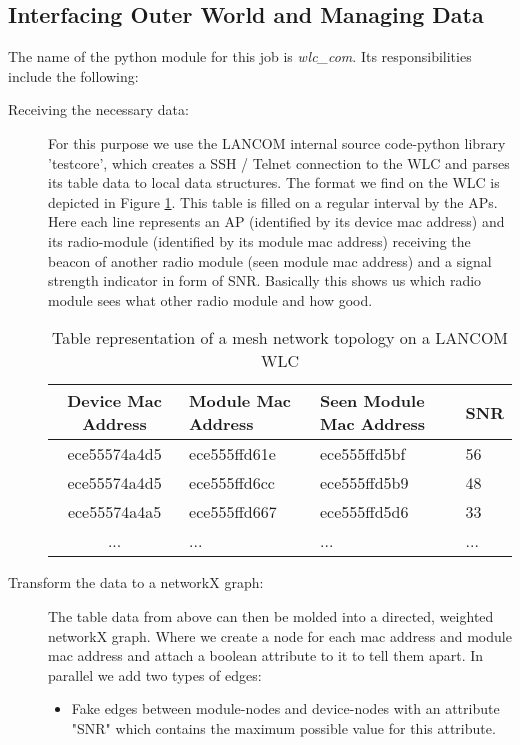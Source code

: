     \subsection{Interfacing Outer World and Managing Data}
      The name of the python module for this job is \textit{wlc\_com}. Its responsibilities include the following:
      \begin{description}
	\item[Receiving the necessary data:]
	  For this purpose we use the LANCOM internal source code-python library 'testcore', which creates a \ac{SSH} / Telnet connection to the 
	  \ac{WLC} and parses its table data to local data structures.
	  The format we find on the \ac{WLC} is depicted in Figure \ref{tab:wlc}. This table is filled on a regular interval by the APs.
	  Here each line represents an \ac{AP} (identified by its device mac address) and its radio-module (identified by its module mac address) receiving the beacon
	  of another radio module (seen module mac address) and a signal strength indicator in form of \ac{SNR}. Basically this shows us which radio module 
	  sees what other radio module and how good.
	  \begin{table}[h!]
	    \begin{tabular}{clll}
	      Device Mac Address & Module Mac Address & Seen Module Mac Address & \ac{SNR}\\ \hline
	      ece55574a4d5 & ece555ffd61e & ece555ffd5bf & 56 \\
	      ece55574a4d5 & ece555ffd6cc & ece555ffd5b9 & 48 \\
	      ece55574a4a5 & ece555ffd667 & ece555ffd5d6 & 33 \\
	      ... & ... & ... & ...
	    \end{tabular}
	    \caption{Table representation of a mesh network topology on a LANCOM \ac{WLC}}
	    \label{tab:wlc}
	  \end{table}
	  
\newpage
	
	\item [Transform the data to a networkX graph:]
	  The table data from above can then be molded into a directed, weighted networkX graph. 
	  Where we create a node for each mac address and module mac address and attach a boolean attribute to it to tell them apart. 
	  In parallel we add two types of edges:

	  \begin{itemize}
	    \item Fake edges between module-nodes and device-nodes with an attribute "SNR" which contains the maximum possible value for this attribute.
	    

\end{itemize}
\end{description}
